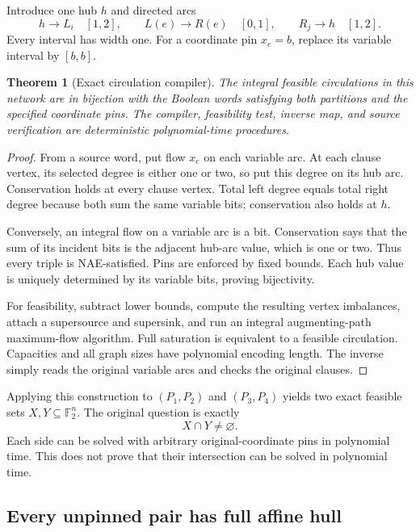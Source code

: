 \documentclass[11pt,letterpaper]{article}
\newtheorem{theorem}{Theorem}
\theoremstyle{definition}
\newcommand{\F}{\mathbb F_2}
\begin{document}
Introduce one hub $h$ and directed arcs
\[
h\longrightarrow L_i\quad[1,2],\qquad
L(e)\longrightarrow R(e)\quad[0,1],\qquad
R_j\longrightarrow h\quad[1,2].
\]
Every interval has width one. For a coordinate pin $x_e=b$, replace its variable interval by $[b,b]$.

\begin{theorem}[Exact circulation compiler]\label{thm:flow}
The integral feasible circulations in this network are in bijection with the Boolean words satisfying both partitions and the specified coordinate pins. The compiler, feasibility test, inverse map, and source verification are deterministic polynomial-time procedures.
\end{theorem}
\begin{proof}
From a source word, put flow $x_e$ on each variable arc. At each clause vertex, its selected degree is either one or two, so put this degree on its hub arc. Conservation holds at every clause vertex. Total left degree equals total right degree because both sum the same variable bits; conservation also holds at $h$.

Conversely, an integral flow on a variable arc is a bit. Conservation says that the sum of its incident bits is the adjacent hub-arc value, which is one or two. Thus every triple is NAE-satisfied. Pins are enforced by fixed bounds. Each hub value is uniquely determined by its variable bits, proving bijectivity.

For feasibility, subtract lower bounds, compute the resulting vertex imbalances, attach a supersource and supersink, and run an integral augmenting-path maximum-flow algorithm. Full saturation is equivalent to a feasible circulation. Capacities and all graph sizes have polynomial encoding length. The inverse simply reads the original variable arcs and checks the original clauses.
\end{proof}

Applying this construction to $(P_1,P_2)$ and $(P_3,P_4)$ yields two exact feasible sets $X,Y\subseteq\F^n$. The original question is exactly
\[
X\cap Y\ne\varnothing.
\]
Each side can be solved with arbitrary original-coordinate pins in polynomial time. This does not prove that their intersection can be solved in polynomial time.

\subsection{Every unpinned pair has full affine hull}
\end{document}
